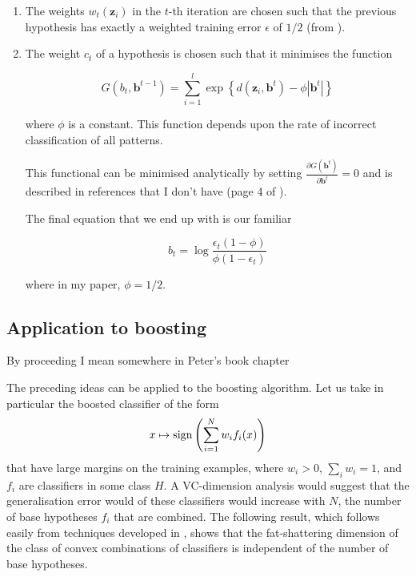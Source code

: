 \begin{enumerate}

\item 	The weights $w_t(\mathbf{z}_i)$ in the $t$-th iteration
	are chosen such that the previous hypothesis has exactly a
	weighted training error $\epsilon$ of $1/2$ (from
	\cite{Schapire97}).

\item 	The weight $c_t$ of a hypothesis is chosen such that it
	minimises the function

	\begin{equation}
	G(b_t, \mathbf{b}^{t-1}) = \sum_{i=1}^l \exp 
	\left\{ d(\mathbf{z}_i, \mathbf{b}^t) - \phi | \mathbf{b}^t |
	\right\}
	\end{equation}

	where $\phi$ is a constant.  This function depends upon the
	rate of incorrect classification of all patterns.

	This functional can be minimised analytically by setting
	$\frac{\partial G(\mathbf{b}^t)}{\partial \mathbf{b}^t}=0$ and
	is described in references that I don't have (page 4 of
	\cite{Schapire97}).

	The final equation that we end up with is our familiar

	\begin{equation}
	b_t = \log \frac{\epsilon_t (1-\phi)}
	{\phi (1 - \epsilon_t)}
	\end{equation}

	where in my paper, $\phi=1/2$.

\end{enumerate}
 




\subsection{Application to boosting}
By proceeding I mean somewhere in Peter's book chapter

The preceding ideas can be applied to the boosting algorithm.  Let us
take in particular the boosted classifier of the form
\begin{equation}
x \mapsto \mathrm{sign} \left( \sum_{i=1}^{N} w_i f_i(x) \right)
\end{equation}
that have large margins on the training examples, where $w_i > 0$,
$\sum_i w_i = 1$, and $f_i$ are classifiers in some class $H$.  A
VC-dimension analysis would suggest that the generalisation error
would of these classifiers would increase with $N$, the number of base
hypotheses $f_i$ that are combined.  The following result, which
follows easily from techniques developed in \cite{Bartlett98}, shows
that the fat-shattering dimension of the class of convex combinations
of classifiers is independent of the number of base hypotheses.

